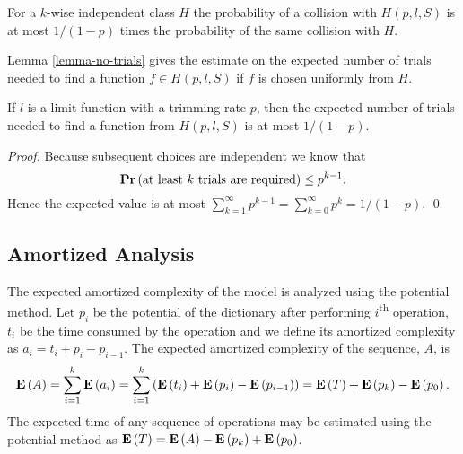 For a $k$-wise independent class $H$ the probability of a collision with $H(p, l, S)$ is at most $1 / (1 - p)$ times the probability of the same collision with $H$.

Lemma \ref{lemma-no-trials} gives the estimate on the expected number of trials needed to find a function $f \in H(p, l, S)$ if $f$ is chosen uniformly from $H$.

\begin{lemma}
\label{lemma-no-trials}
If $l$ is a limit function with a trimming rate $p$, then the expected number of trials needed to find a function from $H(p, l, S)$ is at most ${1}/{(1 - p)}$.
\end{lemma}
\begin{proof}
Because subsequent choices are independent we know that \[\mathbf{Pr}\left(\mbox{at least }k\mbox{ trials are required}\right) \leq p^{k - 1}.\]
Hence the expected value is at most $\sum_{k = 1}^{\infty} p^{k - 1} = \sum_{k = 0}^{\infty} p^k = {1}/{(1 - p)}.$
\qed
\end{proof}

\subsection{Amortized Analysis}
The expected amortized complexity of the model is analyzed using the potential method. Let $p_i$ be the potential of the dictionary after performing $i$\textsuperscript{th} operation, $t_i$ be the time consumed by the operation and we define its amortized complexity as $a_i = t_i + p_i - p_{i - 1}$. The expected amortized complexity of the sequence, $A$, is
\[
\mathbf{E}\left(A\right) = \sum_{i=1}^{k} \mathbf{E}\left(a_i\right) = \sum_{i = 1}^{k} \left(\mathbf{E}\left(t_i\right) + \mathbf{E}\left(p_i\right) - \mathbf{E}\left(p_{i - 1}\right)\right) = \mathbf{E}\left(T\right) + \mathbf{E}\left(p_k\right) - \mathbf{E}\left(p_0\right).
\]
The expected time of any sequence of operations may be estimated using the potential method as $\mathbf{E}\left(T\right) = \mathbf{E}\left(A\right) - \mathbf{E}\left(p_k\right) + \mathbf{E}\left(p_0\right)$.

